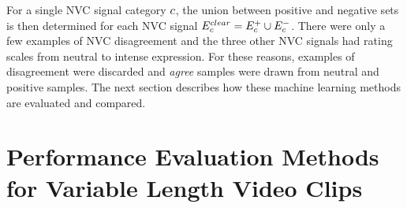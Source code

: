 
For a single \ac{NVC} signal category $c$, the union between positive and negative sets is then determined for each \ac{NVC} signal $E^{clear}_{c} = E^{+}_{c} \cup E^{-}_{c}$. There were only a few examples of \ac{NVC} disagreement and the three other \ac{NVC} signals had rating scales from neutral to intense expression. For these reasons, examples of disagreement were discarded and \textit{agree} samples were drawn from neutral and positive samples. The next section describes how these machine learning methods are evaluated and compared.

\section{Performance Evaluation Methods for Variable Length Video Clips}
\label{SectionClassificationPerformance}



